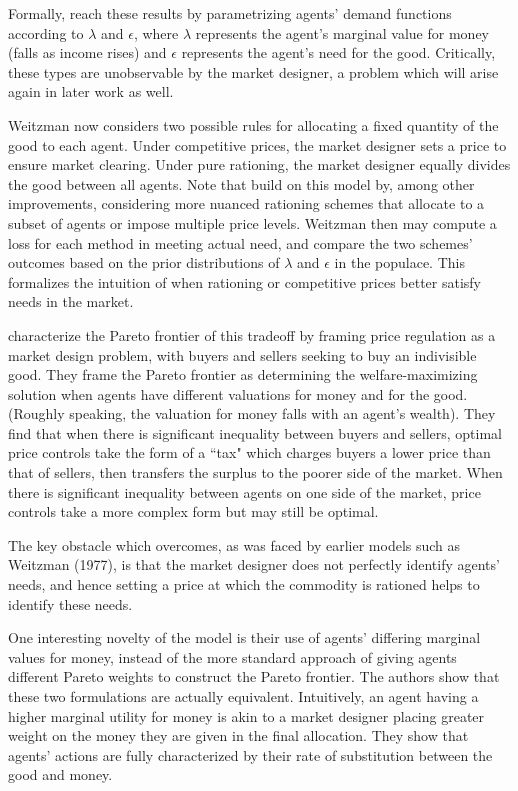 \documentclass[AER]{AEA}
\begin{document}
Formally, \cite{weitzman-1977} reach these results by parametrizing agents' demand functions according to $\lambda$ and $\epsilon$, where $\lambda$ represents the agent's marginal value for money (falls as income rises) and $\epsilon$ represents the agent's need for the good. Critically, these types are unobservable by the market designer, a problem which will arise again in later work as well.

Weitzman now considers two possible rules for allocating a fixed quantity of the good to each agent. Under competitive prices, the market designer sets a price to ensure market clearing. Under pure rationing, the market designer equally divides the good between all agents. Note that \cite{dworczak-2020} build on this model by, among other improvements, considering more nuanced rationing schemes that allocate to a subset of agents or impose multiple price levels. Weitzman then may compute a loss for each method in meeting actual need, and compare the two schemes' outcomes based on the prior distributions of $\lambda$ and $\epsilon$ in the populace. This formalizes the intuition of when rationing or competitive prices better satisfy needs in the market.

\cite{dworczak-2020} characterize the Pareto frontier of this tradeoff by framing price regulation as a market design problem, with buyers and sellers seeking to buy an indivisible good. They frame the Pareto frontier as determining the welfare-maximizing solution when agents have different valuations for money and for the good. (Roughly speaking, the valuation for money falls with an agent's wealth). They find that when there is significant inequality between buyers and sellers, optimal price controls take the form of a ``tax" which charges buyers a lower price than that of sellers, then transfers the surplus to the poorer side of the market. When there is significant inequality between agents on one side of the market, price controls take a more complex form but may still be optimal.

The key obstacle which \cite{dworczak-2020} overcomes, as was faced by earlier models such as Weitzman (1977), is that the market designer does not perfectly identify agents' needs, and hence setting a price at which the commodity is rationed helps to identify these needs.

One interesting novelty of the \cite{dworczak-2020} model is their use of agents' differing marginal values for money, instead of the more standard approach of giving agents different Pareto weights to construct the Pareto frontier. The authors show that these two formulations are actually equivalent. Intuitively, an agent having a higher marginal utility for money is akin to a market designer placing greater weight on the money they are given in the final allocation. They show that agents' actions are fully characterized by their rate of substitution between the good and money.
\end{document}
